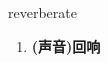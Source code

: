 
\begin{frame}
{\huge reverberate}
\begin{center}
\begin{enumerate}\Large
  \item \textbf{(声音)回响}
\end{enumerate}
\end{center}
\end{frame}
